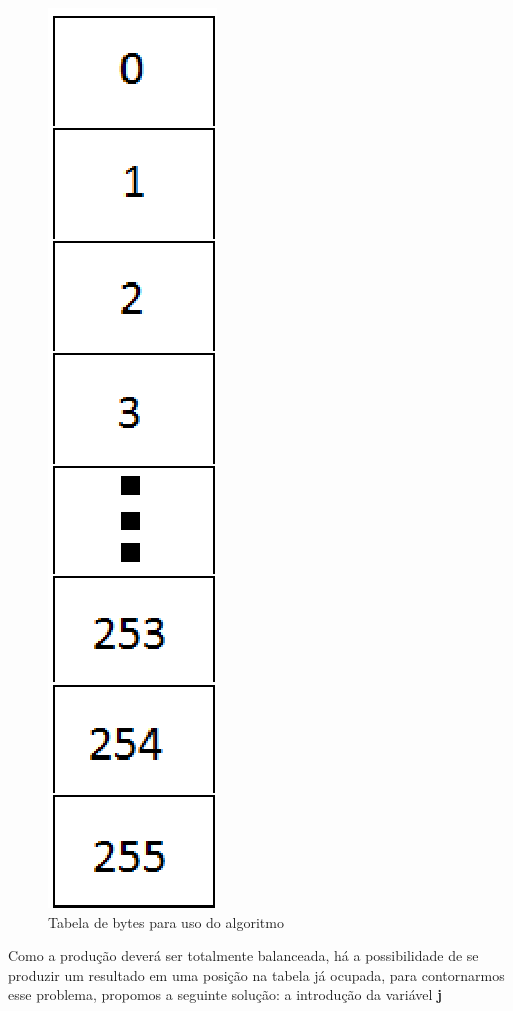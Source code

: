 \begin{figure}[h]
	\centering
	\includegraphics[scale=0.7]{figuras/tabela.eps}
	\caption{Tabela de bytes para uso do algoritmo}
\end{figure}

Como a produção deverá ser totalmente balanceada, há a possibilidade de se produzir um resultado em uma posição na tabela já ocupada, para contornarmos esse problema, propomos a seguinte solução: a introdução da variável \textbf{j}

